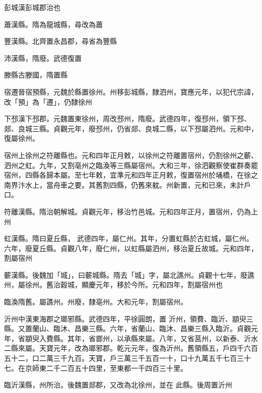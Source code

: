 \begin{pinyinscope}
 彭城漢彭城郡治也



 蕭漢縣。隋為龍城縣，尋改為蕭



 豐漢縣。北齊置永昌郡，尋省為豐縣



 沛漢縣，隋廢。武德復置



 滕縣古滕國，隋置縣



 宿遷晉宿預縣，元魏於縣置徐州。州移彭城縣，隸泗州，寶應元年，以犯代宗諱，改「預」為「遷」，仍隸徐州



 下邳漢下邳郡。元魏置東徐州，周改邳州，隋廢。武德四年，復邳州，領下邳、郯、良城三縣。貞觀元年，廢邳州，仍省郯、良城二縣，以下邳屬泗州。元和中，復屬徐州。



 宿州上徐州之符離縣也。元和四年正月敕，以徐州之符離置宿州，仍割徐州之蘄、泗州之虹。九年，又割亳州之臨渙等三縣屬宿州。大和三年，徐泗觀察使崔群奏罷宿州，四縣各歸本屬。至七年敕，宜準元和四年正月敕，復置宿州於埇橋，在徐之南界汴水上，當舟車之要。其舊割四縣，仍舊來躭。州新置，元和已來，未計戶口。



 符離漢縣。隋治朝解城。貞觀元年，移治竹邑城。元和四年正月，置宿州，仍為上州



 虹漢縣。隋曰夏丘縣，
 武德四年，屬仁州。其年，分置虹縣於古虹城，屬仁州。六年，廢夏丘縣。貞觀八年，廢仁州，以虹縣屬泗州，移治夏丘故城。元和四年，割屬宿州



 蘄漢縣。後魏加「城」，曰蘄城縣。隋去「城」字，屬北譙州。貞觀十七年，廢譙州，屬徐州。舊治穀城，顯慶元年，移於今所。元和四年，割屬宿州也



 臨渙隋舊。屬譙州。州廢，隸亳州。大和元年，割屬宿州。



 沂州中漢東海郡之瑯邪縣。武德四年，平徐圓朗，置
 沂州，領費、臨沂、顓臾三縣。又置蘭山、臨沐、昌樂三縣。六年，省蘭山、臨沐、昌樂三縣入臨沂。貞觀元年，省顓臾入費縣。其年，省鄫州，以承縣來屬。八年，又省莒州，以新泰、沂水二縣來屬。天寶元年，改為瑯邪郡。乾元元年，復為沂州。舊領縣五，戶四千六百五十二，口二萬三千九百。天寶，戶三萬三千五百一十，口十九萬五千七百三十七。在京師東二千二百五十四里，至東都一千四百三十里。



 臨沂漢縣，州所治。後魏置郯郡，又改為北徐州，並在
 此縣。後周置沂州




\end{pinyinscope}
